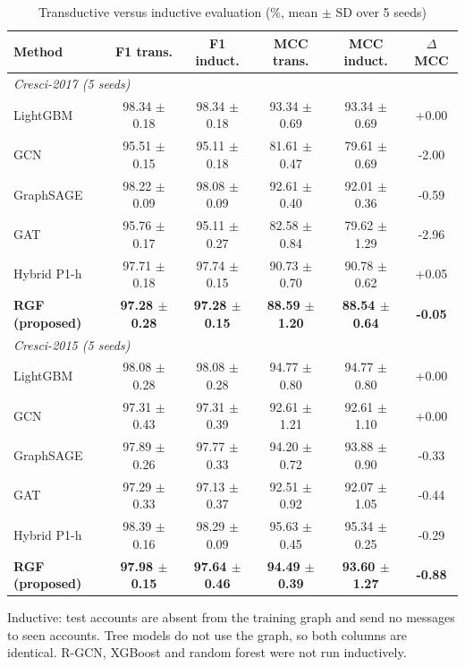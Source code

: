 \begin{table}[!t]
\caption{Transductive versus inductive evaluation (\%, mean $\pm$ SD over 5 seeds)}
\label{tab:inductive}
\centering\footnotesize
\setlength{\tabcolsep}{3pt}
\begin{tabular}{lccccc}
\hline
Method & F1 trans. & F1 induct. & MCC trans. & MCC induct. & $\Delta$MCC \\
\hline
\multicolumn{6}{l}{\textit{Cresci-2017 (5 seeds)}} \\
LightGBM & 98.34 $\pm$ 0.18 & 98.34 $\pm$ 0.18 & 93.34 $\pm$ 0.69 & 93.34 $\pm$ 0.69 & +0.00 \\
GCN & 95.51 $\pm$ 0.15 & 95.11 $\pm$ 0.18 & 81.61 $\pm$ 0.47 & 79.61 $\pm$ 0.69 & -2.00 \\
GraphSAGE & 98.22 $\pm$ 0.09 & 98.08 $\pm$ 0.09 & 92.61 $\pm$ 0.40 & 92.01 $\pm$ 0.36 & -0.59 \\
GAT & 95.76 $\pm$ 0.17 & 95.11 $\pm$ 0.27 & 82.58 $\pm$ 0.84 & 79.62 $\pm$ 1.29 & -2.96 \\
Hybrid P1-h & 97.71 $\pm$ 0.18 & 97.74 $\pm$ 0.15 & 90.73 $\pm$ 0.70 & 90.78 $\pm$ 0.62 & +0.05 \\
\textbf{RGF (proposed)} & \textbf{97.28 $\pm$ 0.28} & \textbf{97.28 $\pm$ 0.15} & \textbf{88.59 $\pm$ 1.20} & \textbf{88.54 $\pm$ 0.64} & \textbf{-0.05} \\
\multicolumn{6}{l}{\textit{Cresci-2015 (5 seeds)}} \\
LightGBM & 98.08 $\pm$ 0.28 & 98.08 $\pm$ 0.28 & 94.77 $\pm$ 0.80 & 94.77 $\pm$ 0.80 & +0.00 \\
GCN & 97.31 $\pm$ 0.43 & 97.31 $\pm$ 0.39 & 92.61 $\pm$ 1.21 & 92.61 $\pm$ 1.10 & +0.00 \\
GraphSAGE & 97.89 $\pm$ 0.26 & 97.77 $\pm$ 0.33 & 94.20 $\pm$ 0.72 & 93.88 $\pm$ 0.90 & -0.33 \\
GAT & 97.29 $\pm$ 0.33 & 97.13 $\pm$ 0.37 & 92.51 $\pm$ 0.92 & 92.07 $\pm$ 1.05 & -0.44 \\
Hybrid P1-h & 98.39 $\pm$ 0.16 & 98.29 $\pm$ 0.09 & 95.63 $\pm$ 0.45 & 95.34 $\pm$ 0.25 & -0.29 \\
\textbf{RGF (proposed)} & \textbf{97.98 $\pm$ 0.15} & \textbf{97.64 $\pm$ 0.46} & \textbf{94.49 $\pm$ 0.39} & \textbf{93.60 $\pm$ 1.27} & \textbf{-0.88} \\
\hline
\end{tabular}
\par\smallskip\parbox{\linewidth}{\scriptsize Inductive: test accounts are absent from the training graph and send no messages to seen accounts. Tree models do not use the graph, so both columns are identical. R-GCN, XGBoost and random forest were not run inductively.}
\end{table}